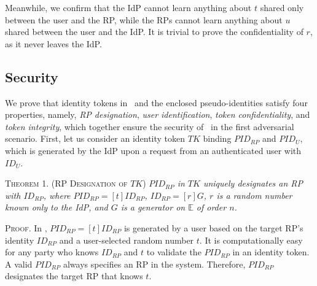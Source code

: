 Meanwhile, we confirm that the IdP cannot learn anything about $t$ shared only between the user and the RP, while the RPs cannot learn anything about $u$ shared between the user and the IdP. It is trivial to prove the confidentiality of $r$, as it never leaves the IdP.

\subsection{Security}
\label{analysis-security}


We prove that identity tokens in \usso~and the enclosed pseudo-identities satisfy four properties, namely, \emph{RP designation}, \emph{user identification}, \emph{token confidentiality}, and \emph{token integrity}, which together ensure the security of \usso~in the first adversarial scenario. 
First, let us consider an identity token $TK$ binding $PID_{RP}$ and $PID_U$, which is generated by the IdP upon a request from an authenticated user with $ID_U$.


\vspace{3mm}
\noindent\textsc{Theorem 1. (RP Designation of $TK$)} {\em $PID_{RP}$ in $TK$ uniquely designates an RP with $ID_{RP}$, where $PID_{RP}= [t]ID_{RP}$, $ID_{RP} = [r]G$, $r$ is a random number known only to the IdP, and $G$ is a generator on $\mathbb{E}$ of order $n$.}

\vspace{0.75mm}
\noindent\textsc{Proof.} In \usso, $PID_{RP}=[t]ID_{RP}$ is generated by a user based on the target RP's identity $ID_{RP}$ and a user-selected random number $t$. 
It is computationally easy for any party who knows $ID_{RP}$ and $t$ to validate the $PID_{RP}$ in an identity token. A valid $PID_{RP}$ always specifies an RP in the system. %
Therefore, $PID_{RP}$ designates the target RP that knows $t$.

